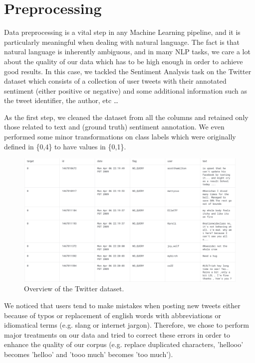 \section*{Preprocessing}

Data preprocessing is a vital step in any Machine Learning pipeline, and it is particularly meaningful when dealing with natural language.
The fact is that natural language is inherently ambiguous, and in many NLP tasks, we care a lot about the quality of our data which has to be high enough in order to achieve good results.
In this case, we tackled the Sentiment Analysis task on the Twitter dataset which consists of a collection of user tweets with their annotated sentiment (either positive or negative) and some additional information such as the tweet identifier, the author, etc \dots

As the first step, we cleaned the dataset from all the columns and retained only those related to text and (ground truth) sentiment annotation. We even performed some minor transformations on class labels which were originally defined in \{0,4\} to have values in \{0,1\}.

\begin{figure}[h!t]
    \centering
    \includegraphics[scale=0.32]{twitter_overview.png}
    \caption{Overview of the Twitter dataset.}
    \label{fig:TWITTER_OVERVIEW}
\end{figure}

We noticed that users tend to make mistakes when posting new tweets either because of typos or replacement of english words with abbreviations or idiomatical terms (e.g. slang or internet jargon).
Therefore, we chose to perform major treatments on our data and tried to correct these errors in order to enhance the quality of our corpus (e.g. replace duplicated characters, 'hellooo' becomes 'helloo' and 'tooo much' becomes 'too much').


